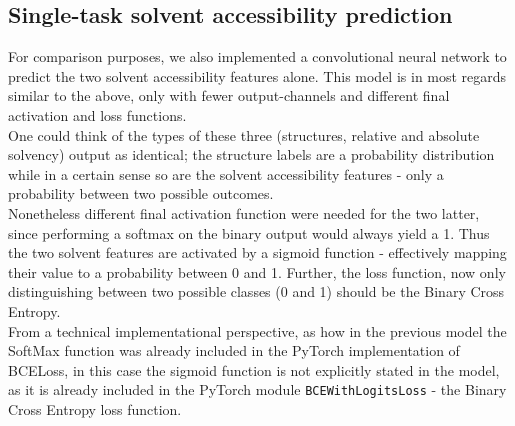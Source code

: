 \begin{multicols}{2}
\subsection{Single-task solvent accessibility prediction}
For comparison purposes, we also implemented a convolutional neural network to predict the two solvent accessibility features alone. This model is in most regards similar to the above, only with fewer output-channels and different final activation and loss functions.\\
One could think of the types of these three (structures, relative and absolute solvency) output as identical; the structure labels are a probability distribution while in a certain sense so are the solvent accessibility features - only a probability between two possible outcomes.\\
Nonetheless different final activation function were needed for the two latter, since performing a softmax on the binary output would always yield a 1. Thus the two solvent features are activated by a sigmoid function - effectively mapping their value to a probability between 0 and 1. Further, the loss function, now only distinguishing between two possible classes (0 and 1) should be the Binary Cross Entropy.\\
From a technical implementational perspective, as how in the previous model the SoftMax function was already included in the PyTorch implementation of BCELoss, in this case the sigmoid function is not explicitly stated in the model, as it is already included in the PyTorch module \texttt{BCEWithLogitsLoss} - the Binary Cross Entropy loss function.


\end{multicols}
